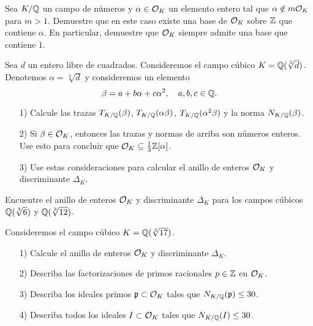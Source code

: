 \begin{ejercicio}
  Sea $K/\mathbb{Q}$ un campo de números y $\alpha \in \mathcal{O}_K$ un elemento entero tal que
  $\alpha \notin m \mathcal{O}_K$ para $m > 1$. Demuestre que en este caso
  existe una base de $\mathcal{O}_K$ sobre $\mathbb{Z}$ que contiene $\alpha$. En particular,
  demuestre que $\mathcal{O}_K$ siempre admite una base que contiene $1$.
\end{ejercicio}

\begin{ejercicio}
  \label{ejerc:anillo-de-enteros-cubico}
  Sea $d$ un entero libre de cuadrados. Consideremos el campo cúbico
  $K = \mathbb{Q} (\sqrt[3]{d})$. Denotemos $\alpha = \sqrt[3]{d}$ y consideremos
  un elemento
  $$\beta = a + b\alpha + c\alpha^2, \quad a,b,c \in \mathbb{Q}.$$

  \begin{enumerate}
  \item[1)] Calcule las trazas
    $T_{K/\mathbb{Q}} (\beta)$, $T_{K/\mathbb{Q}} (\alpha\beta)$, $T_{K/\mathbb{Q}} (\alpha^2\beta)$
    y la norma $N_{K/\mathbb{Q}} (\beta)$.

  \item[2)] Si $\beta \in \mathcal{O}_K$, entonces las trazas y normas de arriba son
    números enteros. Use esto para concluir que
    $\mathcal{O}_K  \subseteq \frac{1}{3} \mathbb{Z} [\alpha]$.

  \item[3)] Use estas consideraciones para calcular el anillo de enteros $\mathcal{O}_K$
    y discriminante $\Delta_K$.
  \end{enumerate}
\end{ejercicio}

\begin{ejercicio}
  Encuentre el anillo de enteros $\mathcal{O}_K$ y discriminante $\Delta_K$ para
  los campos cúbicos $\mathbb{Q} (\sqrt[3]{6})$ y $\mathbb{Q} (\sqrt[3]{12})$.
\end{ejercicio}

\begin{ejercicio}
  Consideremos el campo cúbico $K = \mathbb{Q} (\sqrt[3]{17})$.

  \begin{enumerate}
  \item[1)] Calcule el anillo de enteros $\mathcal{O}_K$ y discriminante $\Delta_K$.
  \item[2)] Describa las factorizaciones de primos racionales $p \in \mathbb{Z}$ en
    $\mathcal{O}_K$.
  \item[3)] Describa los ideales primos $\mathfrak{p} \subset \mathcal{O}_K$
    tales que $N_{K/\mathbb{Q}} (\mathfrak{p}) \le 30$.
  \item[4)] Describa todos los ideales $I \subset \mathcal{O}_K$
    tales que $N_{K/\mathbb{Q}} (I) \le 30$.
  \end{enumerate}
\end{ejercicio}

